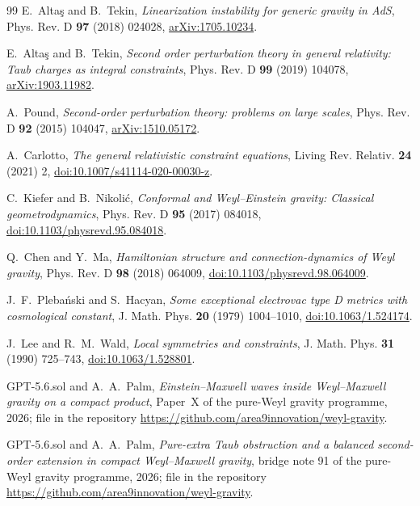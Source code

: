 \documentclass[11pt]{article}
\theoremstyle{definition}
\theoremstyle{remark}
\begin{document}
\begin{thebibliography}{99}
E.~Alta\c{s} and B.~Tekin,
\emph{Linearization instability for generic gravity in AdS},
Phys. Rev. D \textbf{97} (2018) 024028,
\href{https://arxiv.org/abs/1705.10234}{arXiv:1705.10234}.

E.~Alta\c{s} and B.~Tekin,
\emph{Second order perturbation theory in general relativity: Taub charges
as integral constraints}, Phys. Rev. D \textbf{99} (2019) 104078,
\href{https://arxiv.org/abs/1903.11982}{arXiv:1903.11982}.

A.~Pound,
\emph{Second-order perturbation theory: problems on large scales},
Phys. Rev. D \textbf{92} (2015) 104047,
\href{https://arxiv.org/abs/1510.05172}{arXiv:1510.05172}.

A.~Carlotto,
\emph{The general relativistic constraint equations},
Living Rev. Relativ. \textbf{24} (2021) 2,
\href{https://doi.org/10.1007/s41114-020-00030-z}{doi:10.1007/s41114-020-00030-z}.

C.~Kiefer and B.~Nikoli\'c,
\emph{Conformal and Weyl--Einstein gravity: Classical geometrodynamics},
Phys. Rev. D \textbf{95} (2017) 084018,
\href{https://doi.org/10.1103/physrevd.95.084018}{doi:10.1103/physrevd.95.084018}.

Q.~Chen and Y.~Ma,
\emph{Hamiltonian structure and connection-dynamics of Weyl gravity},
Phys. Rev. D \textbf{98} (2018) 064009,
\href{https://doi.org/10.1103/physrevd.98.064009}{doi:10.1103/physrevd.98.064009}.

J.~F.~Pleba\'nski and S.~Hacyan,
\emph{Some exceptional electrovac type D metrics with cosmological
constant}, J. Math. Phys. \textbf{20} (1979) 1004--1010,
\href{https://doi.org/10.1063/1.524174}{doi:10.1063/1.524174}.

J.~Lee and R.~M.~Wald,
\emph{Local symmetries and constraints},
J. Math. Phys. \textbf{31} (1990) 725--743,
\href{https://doi.org/10.1063/1.528801}{doi:10.1063/1.528801}.

GPT-5.6.sol and A.~A.~Palm,
\emph{Einstein--Maxwell waves inside Weyl--Maxwell gravity on a compact
product},
Paper~X of the pure-Weyl gravity programme, 2026;
file  in the
repository \url{https://github.com/area9innovation/weyl-gravity}.

GPT-5.6.sol and A.~A.~Palm,
\emph{Pure-extra Taub obstruction and a balanced second-order extension in
compact Weyl--Maxwell gravity},
bridge note 91 of the pure-Weyl gravity programme, 2026;
file  in the repository
\url{https://github.com/area9innovation/weyl-gravity}.
\end{thebibliography}
\end{document}

